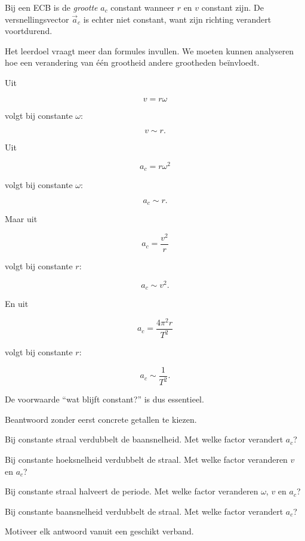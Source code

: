 \documentclass{ximera}
\begin{document}
\begin{opmerking}
Bij een ECB is de \emph{grootte} $a_c$ constant wanneer $r$ en $v$
constant zijn. De versnellingsvector $\vec a_c$ is echter niet constant,
want zijn richting verandert voortdurend.
\end{opmerking}




Het leerdoel vraagt meer dan formules invullen. We moeten kunnen
analyseren hoe een verandering van één grootheid andere grootheden
beïnvloedt.

Uit

\[
v=r\omega
\]

volgt bij constante $\omega$:

\[
v\sim r.
\]

Uit

\[
a_c=r\omega^2
\]

volgt bij constante $\omega$:

\[
a_c\sim r.
\]

Maar uit

\[
a_c=\frac{v^2}{r}
\]

volgt bij constante $r$:

\[
a_c\sim v^2.
\]

En uit

\[
a_c=\frac{4\pi^2r}{T^2}
\]

volgt bij constante $r$:

\[
a_c\sim\frac1{T^2}.
\]

De voorwaarde ``wat blijft constant?'' is dus essentieel.


\begin{oefening}{\oefU\ESS}

Beantwoord zonder eerst concrete getallen te kiezen.

\begin{question}
Bij constante straal verdubbelt de baansnelheid. Met welke factor
verandert $a_c$?
\end{question}

\begin{question}
Bij constante hoeksnelheid verdubbelt de straal. Met welke factor
veranderen $v$ en $a_c$?
\end{question}

\begin{question}
Bij constante straal halveert de periode. Met welke factor veranderen
$\omega$, $v$ en $a_c$?
\end{question}

\begin{question}
Bij constante baansnelheid verdubbelt de straal. Met welke factor
verandert $a_c$?
\end{question}

Motiveer elk antwoord vanuit een geschikt verband.

\end{oefening}
\end{document}
